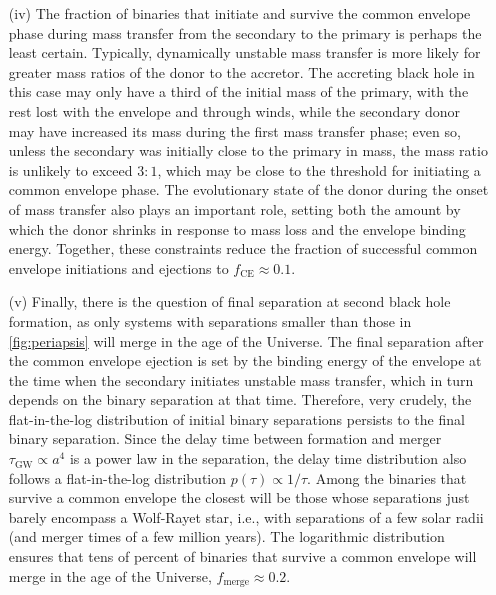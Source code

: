 \documentclass[iop,onecolumn]{revtex4}
\begin{document}
\begin{enumerate}
\item[(iv)] The fraction of binaries that initiate and survive the common envelope phase during mass transfer from the secondary to the primary is perhaps the least certain.  Typically, dynamically unstable mass transfer is more likely for greater mass ratios of the donor to the accretor.  The accreting black hole in this case may only have a third of the initial mass of the primary, with the rest lost with the envelope and through winds, while the secondary donor may have increased its mass during the first mass transfer phase; even so, unless the secondary was initially close to the primary in mass, the mass ratio is unlikely to exceed $3:1$, which may be close to the threshold for initiating a common envelope phase.  The evolutionary state of the donor during the onset of mass transfer also plays an important role, setting both the amount by which the donor shrinks in response to mass loss and the envelope binding energy.  Together, these constraints reduce the fraction of successful common envelope initiations and ejections to $f_\textrm{CE} \approx 0.1$.  

\item[(v)]  Finally, there is the question of final separation at second black hole formation, as only systems with separations smaller than those in \autoref{fig:periapsis} will merge in the age of the Universe.  The final separation after the common envelope ejection is set by the binding energy of the envelope at the time when the secondary initiates unstable mass transfer, which in turn depends on the binary separation at that time.  Therefore, very crudely, the flat-in-the-log distribution of initial binary separations persists to the final binary separation.  Since the delay time between formation and merger $\tau_\textrm{GW} \propto a^4$ is a power law in the separation, the delay time distribution also follows a flat-in-the-log distribution $p(\tau) \propto 1/\tau$.  Among the binaries that survive a common envelope the closest will be those whose separations just barely encompass a Wolf-Rayet star, i.e., with separations of a few solar radii (and merger times of a few million years).  The logarithmic distribution ensures that tens of percent of binaries that survive a common envelope will merge in the age of the Universe, $f_\textrm{merge} \approx 0.2$.
\end{enumerate}
\end{document}
